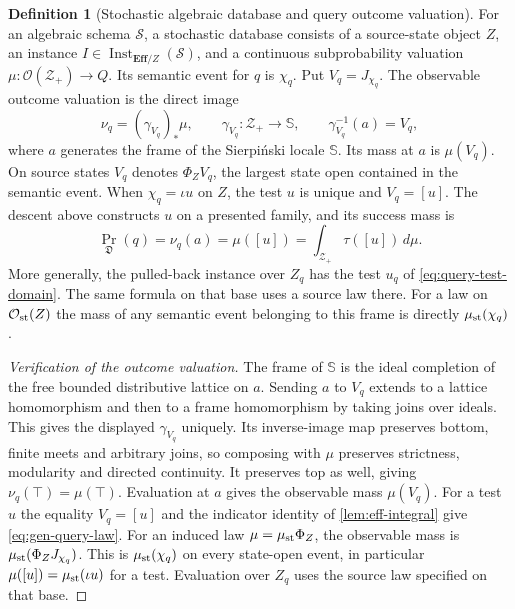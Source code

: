 \documentclass[11pt,a4paper]{article}
\theoremstyle{definition}
\newtheorem{definition}[definition]{Definition}
\theoremstyle{remark}\newaliascnt{remark}{theorem}
\newcommand{\E}{\mathbf{Eff}}
\numberwithin{equation}{section}
\begin{document}
\begin{definition}[Stochastic algebraic database and query outcome valuation]\label{def:gen-measured-instance}
For an algebraic schema $\mathcal S$, a stochastic database consists of a source-state object $Z$, an instance $I\in\operatorname{Inst}_{\E/Z}(\mathcal S)$, and a continuous subprobability valuation $\mu:\mathcal O(\mathcal Z_+)\to Q$. Its semantic event for $q$ is $\chi_q$. Put $V_q=J_{\chi_q}$. The observable outcome valuation is the direct image
\[
 \nu_q=(\gamma_{V_q})_*\mu ,
 \qquad \gamma_{V_q}:\mathcal Z_+\longrightarrow\mathbb S,
 \qquad \gamma_{V_q}^{-1}(a)=V_q ,
\]
where $a$ generates the frame of the Sierpi\'nski locale $\mathbb S$. Its mass at $a$ is $\mu(V_q)$. On source states $V_q$ denotes $\Phi_Z V_q$, the largest state open contained in the semantic event. When $\chi_q=\iota u$ on $Z$, the test $u$ is unique and $V_q=[u]$. The descent above constructs $u$ on a presented family, and its success mass is
\begin{equation}\label{eq:gen-query-law}
 \Pr_{\mathfrak D}(q)=\nu_q(a)=\mu([u])
       =\int_{\mathcal Z_+}\tau([u])\,d\mu.
\end{equation}
More generally, the pulled-back instance over $Z_q$ has the test $u_q$ of \eqref{eq:query-test-domain}. The same formula on that base uses a source law there. For a law on $\mathcal O_{\rm st}(Z)$ the mass of any semantic event belonging to this frame is directly $\mu_{\rm st}(\chi_q)$.
\end{definition}
\begin{proof}[Verification of the outcome valuation]
The frame of $\mathbb S$ is the ideal completion of the free bounded distributive lattice on $a$. Sending $a$ to $V_q$ extends to a lattice homomorphism and then to a frame homomorphism by taking joins over ideals. This gives the displayed $\gamma_{V_q}$ uniquely. Its inverse-image map preserves bottom, finite meets and arbitrary joins, so composing with $\mu$ preserves strictness, modularity and directed continuity. It preserves top as well, giving $\nu_q(\top)=\mu(\top)$. Evaluation at $a$ gives the observable mass $\mu(V_q)$. For a test $u$ the equality $V_q=[u]$ and the indicator identity of \cref{lem:eff-integral} give \eqref{eq:gen-query-law}. For an induced law $\mu=\mu_{\rm st}\Phi_Z$, the observable mass is $\mu_{\rm st}(\Phi_Z J_{\chi_q})$. This is $\mu_{\rm st}(\chi_q)$ on every state-open event, in particular $\mu([u])=\mu_{\rm st}(\iota u)$ for a test. Evaluation over $Z_q$ uses the source law specified on that base.
\end{proof}
\end{document}
